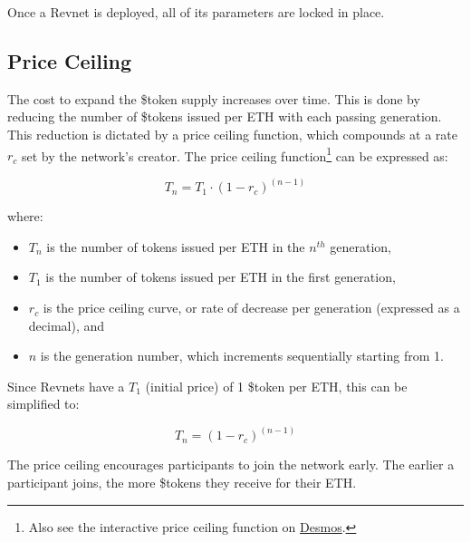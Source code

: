 \documentclass{article}
\begin{document}
Once a Revnet is deployed, all of its parameters are locked in place.

\clearpage

\subsection{Price Ceiling}

The cost to expand the \$token supply increases over time. This is done by reducing the number of \$tokens issued per ETH with each passing generation. This reduction is dictated by a price ceiling function, which compounds at a rate $r_c$ set by the network's creator. The price ceiling function\footnote{Also see the interactive price ceiling function on \href{https://www.desmos.com/calculator/ey9fhuslwe}{Desmos}.} can be expressed as:

\begin{equation}
  T_n = T_1 \cdot (1 - r_c)^{(n - 1)}
\end{equation}

where:
\begin{itemize}
  \item $T_n$ is the number of tokens issued per ETH in the $n^{th}$ generation,
  \item $T_1$ is the number of tokens issued per ETH in the first generation,
  \item $r_c$ is the price ceiling curve, or rate of decrease per generation (expressed as a decimal), and
  \item $n$ is the generation number, which increments sequentially starting from 1.
\end{itemize}

Since Revnets have a $T_1$ (initial price) of 1 \$token per ETH, this can be simplified to:

\begin{equation}
  T_n = (1 - r_c)^{(n - 1)}
\end{equation}

The price ceiling encourages participants to join the network early. The earlier a participant joins, the more \$tokens they receive for their ETH.
\end{document}
